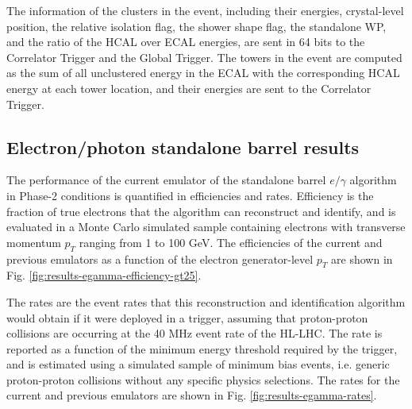 The information of the clusters in the event, including their energies, crystal-level position, the relative isolation flag, the shower shape flag, the standalone WP, and the ratio of the HCAL over ECAL energies, are sent in 64 bits to the Correlator Trigger and the Global Trigger. The towers in the event are computed as the sum of all unclustered energy in the ECAL with the corresponding HCAL energy at each tower location, and their energies are sent to the Correlator Trigger.

\subsection{Electron/photon standalone barrel results}
The performance of the current emulator of the standalone barrel $e/\gamma$ algorithm in Phase-2 conditions is quantified in efficiencies and rates. Efficiency is the fraction of true electrons that the algorithm can reconstruct and identify, and is evaluated in a Monte Carlo simulated sample containing electrons with transverse momentum $p_{T}$ ranging from 1 to 100 GeV.  The efficiencies of the current and previous emulators as a function of the electron generator-level $p_{T}$ are shown in Fig. \ref{fig:results-egamma-efficiency-gt25}. 

The rates are the event rates that this reconstruction and identification algorithm would obtain if it were deployed in a trigger, assuming that proton-proton collisions are occurring at the 40 MHz event rate of the HL-LHC. The rate is reported as a function of the minimum energy threshold required by the trigger, and is estimated using a simulated sample of minimum bias events, i.e. generic proton-proton collisions without any specific physics selections. The rates for the current and previous emulators are shown in Fig. \ref{fig:results-egamma-rates}. 

